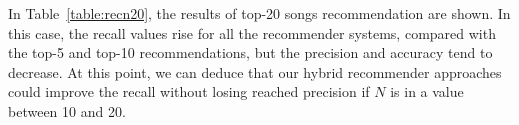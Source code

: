 \documentclass{article}
\begin{document}
In Table~\ref{table:recn20}, the results of top-20 songs recommendation are shown. In this case, the recall values rise for all the recommender systems, compared with the top-5 and top-10 recommendations, but the precision and accuracy tend to decrease. At this point, we can deduce that our hybrid recommender approaches could improve the recall without losing reached precision if $N$ is in a value between 10 and 20.
\begin{table}[htb]
	
	\caption{Evaluation of recommender systems (N=20)} %
	\label{table:recn20} %
\end{table}


\end{document}
